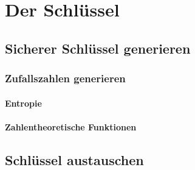 \section{Der Schlüssel}
\subsection{Sicherer Schlüssel generieren}
\subsubsection{Zufallszahlen generieren}
\paragraph{Entropie}
\paragraph{Zahlentheoretische Funktionen}
\subsection{Schlüssel austauschen}
